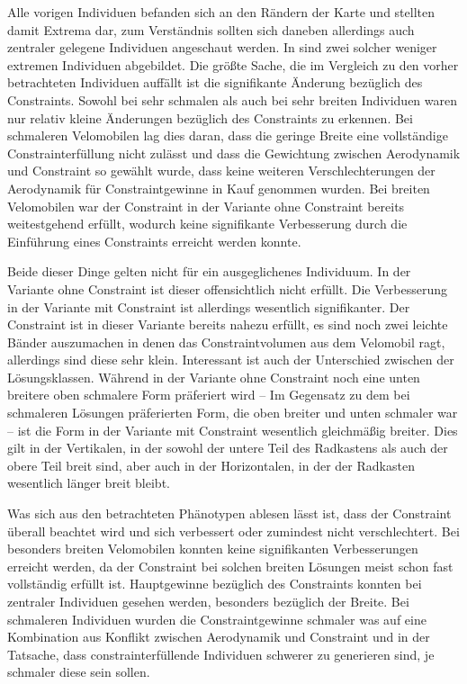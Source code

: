 Alle vorigen Individuen befanden sich an den Rändern der Karte und stellten damit Extrema dar, zum Verständnis sollten sich daneben allerdings auch zentraler gelegene Individuen angeschaut werden.
In  sind zwei solcher weniger extremen Individuen abgebildet.
Die größte Sache, die im Vergleich zu den vorher betrachteten Individuen auffällt ist die signifikante Änderung bezüglich des Constraints.
Sowohl bei sehr schmalen als auch bei sehr breiten Individuen waren nur relativ kleine Änderungen bezüglich des Constraints zu erkennen.
Bei schmaleren Velomobilen lag dies daran, dass die geringe Breite eine vollständige Constrainterfüllung nicht zulässt und dass die Gewichtung zwischen Aerodynamik und Constraint so gewählt wurde, dass keine weiteren Verschlechterungen der Aerodynamik für Constraintgewinne in Kauf genommen wurden.
Bei breiten Velomobilen war der Constraint in der Variante ohne Constraint bereits weitestgehend erfüllt, wodurch keine signifikante Verbesserung durch die Einführung eines Constraints erreicht werden konnte.

Beide dieser Dinge gelten nicht für ein ausgeglichenes Individuum.
In der Variante ohne Constraint ist dieser offensichtlich nicht erfüllt.
Die Verbesserung in der Variante mit Constraint ist allerdings wesentlich signifikanter.
Der Constraint ist in dieser Variante bereits nahezu erfüllt, es sind noch zwei leichte Bänder auszumachen in denen das Constraintvolumen aus dem Velomobil ragt, allerdings sind diese sehr klein.
Interessant ist auch der Unterschied zwischen der Lösungsklassen.
Während in der Variante ohne Constraint noch eine unten breitere oben schmalere Form präferiert wird -- Im Gegensatz zu dem bei schmaleren Lösungen präferierten Form, die oben breiter und unten schmaler war -- ist die Form in der Variante mit Constraint wesentlich gleichmäßig breiter.
Dies gilt in der Vertikalen, in der sowohl der untere Teil des Radkastens als auch der obere Teil breit sind, aber auch in der Horizontalen, in der der Radkasten wesentlich länger breit bleibt.

Was sich aus den betrachteten Phänotypen ablesen lässt ist, dass der Constraint überall beachtet wird und sich verbessert oder zumindest nicht verschlechtert.
Bei besonders breiten Velomobilen konnten keine signifikanten Verbesserungen erreicht werden, da der Constraint bei solchen breiten Lösungen meist schon fast vollständig erfüllt ist.
Hauptgewinne bezüglich des Constraints konnten bei zentraler Individuen gesehen werden, besonders bezüglich der Breite.
Bei schmaleren Individuen wurden die Constraintgewinne schmaler was auf eine Kombination aus Konflikt zwischen Aerodynamik und Constraint und in der Tatsache, dass constrainterfüllende Individuen schwerer zu generieren sind, je schmaler diese sein sollen.



